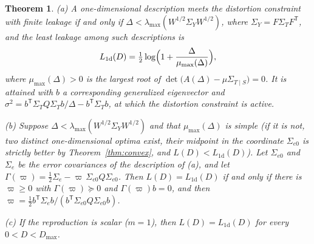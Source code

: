 \documentclass[11pt,onecolumn]{IEEEtran}
\newtheorem{theorem}{Theorem}
\newcommand{\Se}{\Sigma_{e}}
\newcommand{\Sez}{\Sigma_{e0}}
\newcommand{\Kc}{\Sigma_{T\mid S}}
\begin{document}
\begin{theorem}\label{thm:onedim}
(a) A one-dimensional description meets the distortion constraint with
finite leakage if and only if
$\Delta<\lambda_{\max}(W^{1/2}\Sigma_YW^{1/2})$, where
$\Sigma_Y=F\Sigma_TF^{\mathsf T}$, and the least leakage among such
descriptions is
\begin{equation}
L_{\mathrm{1d}}(D)=\tfrac12\log\Bigl(1+\frac{\Delta}{\mu_{\max}(\Delta)}\Bigr),
\label{eq:onedim}
\end{equation}
where $\mu_{\max}(\Delta)>0$ is the largest root of
$\det\bigl(A(\Delta)-\mu\Kc\bigr)=0$. It is attained with $b$ a
corresponding generalized eigenvector and
$\sigma^2=b^{\mathsf T}\Sigma_TQ\Sigma_Tb/\Delta-b^{\mathsf T}\Sigma_Tb$, at
which the distortion constraint is active.

(b) Suppose $\Delta<\lambda_{\max}(W^{1/2}\Sigma_YW^{1/2})$ and that
$\mu_{\max}(\Delta)$ is simple (if it is not, two distinct one-dimensional
optima exist, their midpoint in the coordinate $\Sez$ is strictly better by
Theorem~\ref{thm:convex}, and $L(D)<L_{\mathrm{1d}}(D)$). Let $\Sez$ and
$\Se$ be the error covariances of the description of (a), and let
$\Gamma(\varpi)=\tfrac12\Se-\varpi\,\Sez Q\Sez$. Then $L(D)=L_{\mathrm{1d}}(D)$
if and only if there is $\varpi\ge0$ with $\Gamma(\varpi)\succeq0$ and
$\Gamma(\varpi)b=0$, and then
$\varpi=\tfrac12b^{\mathsf T}\Se b/(b^{\mathsf T}\Sez Q\Sez b)$.

(c) If the reproduction is scalar ($m=1$), then $L(D)=L_{\mathrm{1d}}(D)$
for every $0<D<D_{\max}$.
\end{theorem}
\end{document}
